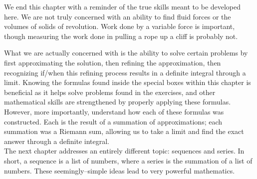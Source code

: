 We end this chapter with a reminder of the true skills meant to be developed here. We are not truly concerned with an ability to find fluid forces or the volumes of solids of revolution. Work done by a variable force is important, though measuring the work done in pulling a rope up a cliff is probably not.

What we are actually concerned with is the ability to solve certain problems by first approximating the solution, then refining the approximation, then recognizing if/when this refining process results in a definite integral through a limit. Knowing the formulas found inside the special boxes within this chapter is beneficial as it helps solve problems found in the exercises, and other mathematical skills are strengthened by properly applying these formulas. However, more importantly, understand how each of these formulas was constructed. Each is the result of a summation of approximations; each summation was a Riemann sum, allowing us to take a limit and find the exact answer through a definite integral. \\

The next chapter addresses an entirely different topic: sequences and series. In short, a sequence is a list of numbers, where a series is the summation of a list of numbers. These seemingly--simple ideas lead to very powerful mathematics.

